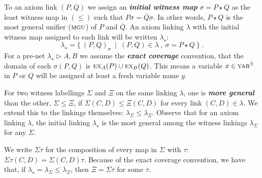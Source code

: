 \documentclass[UKenglish]{lipics-v2016}
\makeatletter
\theoremstyle{plain}
\newcommand\defn[1]{\textit{\textbf{#1}}}
\newcommand\varE{\textsc{var}^\exists}
\newcommand\ex[2]{\textsc{ex}_{#1}(#2)}
\newcommand\+{+}
\renewcommand\*{\times}
\newcommand\dual[1]{\overline{#1}}
\newcommand\seq[3][]{{\vdash_{#1}}#2,#3}
\newcommand\net[3]{#1\triangleright #2,#3}
\newcommand\gen{\leq}
\newcommand\coh{\smallfrown}
\newcommand\join{\vee}
\newcommand\init[2]{#1\star #2}
\newcommand\link[3][\sigma]{(#2,#3)_{#1}}
\newcommand\ucoal{\rightsquigarrow}
\newcommand\srr[1]{
  \ifx#1+\expandafter\@srr\else
  \ifx#1*\*\mathrm S\else
  \ifx#1!\forall\mathrm S\else
  \ifx#1?\exists\mathrm S\else 
  \ifx#11\mathrm{axS}\else
  #1\mathrm S  \fi\fi\fi\fi\fi
}
\newcommand\@srr[1]{+_{#1}\mathrm S}
\newcommand\urr[1]{
  \ifx#1+\expandafter\@urr\else
  \ifx#1*\*\mathrm U\else
  \ifx#1!\forall\mathrm U\else
  \ifx#1?\exists\mathrm U\else 
  \ifx#11\mathrm{axU}\else
  #1\mathrm U
  \fi\fi\fi\fi\fi
}
\newcommand\@urr[1]{+_{#1}\mathrm U}
\makeatother
\begin{document}
To an axiom link $(P,Q)$ we assign an \defn{initial witness map} $\sigma=\init PQ$ as the least witness map in $(\gen)$ such that $P\sigma=\dual Q\sigma$. In other words, $\init PQ$ is the most general unifier ($\textsc{mgu}$) of $P$ and $\dual Q$. An axiom linking $\lambda$ with the initial witness map assigned to each link will be written $\lambda_\star$:
\[
	\lambda_\star = \{~\link PQ~\mid~(P,Q)\in\lambda~,~\sigma=\init PQ~\}~.
\]
For a pre-net $\net{\lambda_\star}AB$ we assume the \defn{exact coverage} convention, that the domain of each $\sigma(P,Q)$ is $\ex AP\cup\ex BQ$. This means a variable $x\in\varE$ in $P$ or $Q$ will be assigned at least a fresh variable name $y$.


For two witness labellings $\Sigma$ and $\Xi$ on the same linking $\lambda$, one is \defn{more general} than the other, $\Sigma\gen\Xi$, if $\Sigma(C,D)\gen\Xi(C,D)$ for every link $(C,D)\in\lambda$. We extend this to the linkings themselves: $\lambda_\Sigma\gen\lambda_\Xi$. Observe that for an axiom linking $\lambda$, the initial linking $\lambda_\star$ is the most general among the witness linkings $\lambda_\Sigma$ for any $\Sigma$.

We write $\Sigma\tau$ for the composition of every map in $\Sigma$ with $\tau$:	$\Sigma\tau(C,D) = \Sigma(C,D)\tau$. Because of the exact coverage convention, we have that, if $\lambda_\star=\lambda_\Sigma\gen\lambda_\Xi$, then $\Xi=\Sigma\tau$ for some $\tau$.



\end{document}

